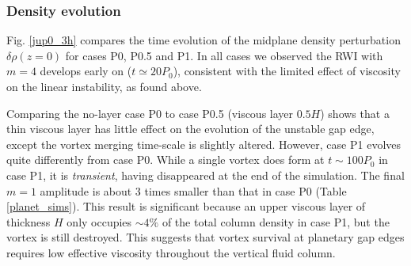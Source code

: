 
\subsubsection{Density evolution}%

Fig. \ref{jup0_3h} compares the time evolution of the midplane density
perturbation $\delta\rho(z=0)$ for cases P0, P0.5 and P1. In 
all cases we observed the RWI with $m=4$ develops early on ($t\simeq20P_0$),
consistent with the limited effect of viscosity on the linear
instability, as found above.  

Comparing the no-layer case P0 to case P0.5 (viscous layer $0.5H$)
shows that a thin viscous layer has little effect on the
evolution of the unstable gap edge, except the vortex merging
time-scale is slightly altered. However, case P1 evolves quite
differently from case P0. While a single vortex does form at
$t\sim100P_0$ in case P1, it is \emph{transient}, having disappeared at the end of
the simulation. The final $m=1$ amplitude is about 3 times smaller
than that in case P0 (Table \ref{planet_sims}). This result is
significant because an upper viscous layer of 
thickness $H$ only occupies $\sim4\%$ of the total column density
in case P1, but the vortex is still destroyed. This suggests that vortex
survival at planetary gap edges requires low effective viscosity
throughout the vertical fluid column. 

